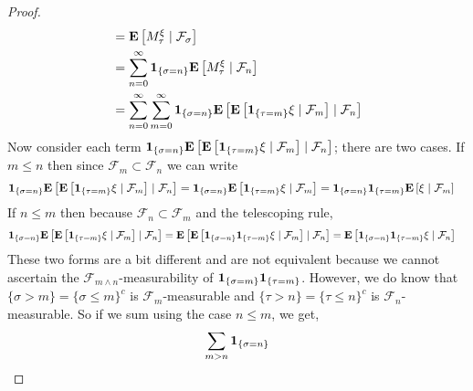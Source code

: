 \documentclass{amsart}
\theoremstyle{remark}
\theoremstyle{definition}
\begin{document}
\begin{proof}
\begin{align*}
&=
\cexpectationlong{\mathcal{F}_\sigma}{M^\xi_\tau}
\\
&= \sum_{n=0}^\infty \characteristic{\lbrace \sigma = n \rbrace}
\cexpectationlong{\mathcal{F}_n}{M^\xi_\tau} \\
&= \sum_{n=0}^\infty \sum_{m=0}^\infty \characteristic{\lbrace \sigma = n \rbrace}
\cexpectationlong{\mathcal{F}_n}{\cexpectationlong{\mathcal{F}_m}{\characteristic{
    \lbrace \tau = m \rbrace } \xi}} \\
\end{align*}
Now consider each term $\characteristic{\lbrace \sigma = n \rbrace}
\cexpectationlong{\mathcal{F}_n}{\cexpectationlong{\mathcal{F}_m}{\characteristic{
    \lbrace \tau = m \rbrace } \xi}}$; there are two cases. If $m \leq n$
then since $\mathcal{F}_m \subset \mathcal{F}_n$ we can write
\begin{align*}
\characteristic{\lbrace \sigma = n \rbrace}
\cexpectationlong{\mathcal{F}_n}{\cexpectationlong{\mathcal{F}_m}{\characteristic{
    \lbrace \tau = m \rbrace } \xi}} &= \characteristic{\lbrace \sigma = n \rbrace}\cexpectationlong{\mathcal{F}_m}{\characteristic{
    \lbrace \tau = m \rbrace } \xi} = \characteristic{\lbrace \sigma = n \rbrace}\characteristic{
    \lbrace \tau = m \rbrace }\cexpectationlong{\mathcal{F}_m}{ \xi} 
\end{align*}
If $n \leq m$ then because $\mathcal{F}_n \subset \mathcal{F}_m$ and
the telescoping rule,
\begin{align*}
\characteristic{\lbrace \sigma = n \rbrace}
\cexpectationlong{\mathcal{F}_n}{\cexpectationlong{\mathcal{F}_m}{\characteristic{
    \lbrace \tau = m \rbrace } \xi}} &= 
\cexpectationlong{\mathcal{F}_n}{\cexpectationlong{\mathcal{F}_m}{\characteristic{\lbrace
      \sigma = n \rbrace} \characteristic{
    \lbrace \tau = m \rbrace } \xi}}  = \cexpectationlong{\mathcal{F}_n}{\characteristic{\lbrace \sigma = n \rbrace}\characteristic{
    \lbrace \tau = m \rbrace } \xi} 
\end{align*}
These two forms are a bit different and are not equivalent because we
cannot ascertain the $\mathcal{F}_{m \wedge n}$-measurability of $\characteristic{\lbrace \sigma = m \rbrace}\characteristic{
    \lbrace \tau = m \rbrace }$.  However, we do know that $\lbrace
  \sigma > m \rbrace = \lbrace \sigma \leq m \rbrace^c$ is
  $\mathcal{F}_m$-measurable and $\lbrace
  \tau > n \rbrace = \lbrace \tau \leq n \rbrace^c$ is
  $\mathcal{F}_n$-measurable.  So if we sum using the case $n \leq m$,
  we get,
\begin{align*}
\sum_{m>n} \characteristic{\lbrace \sigma = n \rbrace}

\end{align*}
\end{proof}
\end{document}
